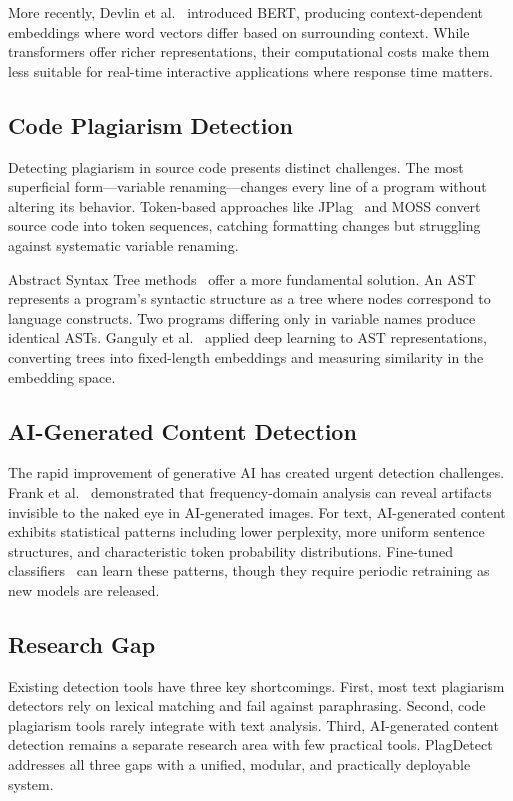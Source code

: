\documentclass[10pt,twocolumn]{article}
\begin{document}
More recently, Devlin et al.~\cite{devlin2019} introduced BERT, producing context-dependent embeddings where word vectors differ based on surrounding context. While transformers offer richer representations, their computational costs make them less suitable for real-time interactive applications where response time matters.

\subsection{Code Plagiarism Detection}

Detecting plagiarism in source code presents distinct challenges. The most superficial form---variable renaming---changes every line of a program without altering its behavior. Token-based approaches like JPlag~\cite{prechelt2002} and MOSS convert source code into token sequences, catching formatting changes but struggling against systematic variable renaming.

Abstract Syntax Tree methods~\cite{ahtiainen2020} offer a more fundamental solution. An AST represents a program's syntactic structure as a tree where nodes correspond to language constructs. Two programs differing only in variable names produce identical ASTs. Ganguly et al.~\cite{ganguly2018} applied deep learning to AST representations, converting trees into fixed-length embeddings and measuring similarity in the embedding space.

\subsection{AI-Generated Content Detection}

The rapid improvement of generative AI has created urgent detection challenges. Frank et al.~\cite{frank2020} demonstrated that frequency-domain analysis can reveal artifacts invisible to the naked eye in AI-generated images. For text, AI-generated content exhibits statistical patterns including lower perplexity, more uniform sentence structures, and characteristic token probability distributions. Fine-tuned classifiers~\cite{zubair2019} can learn these patterns, though they require periodic retraining as new models are released.

\subsection{Research Gap}

Existing detection tools have three key shortcomings. First, most text plagiarism detectors rely on lexical matching and fail against paraphrasing. Second, code plagiarism tools rarely integrate with text analysis. Third, AI-generated content detection remains a separate research area with few practical tools. PlagDetect addresses all three gaps with a unified, modular, and practically deployable system.
\end{document}
